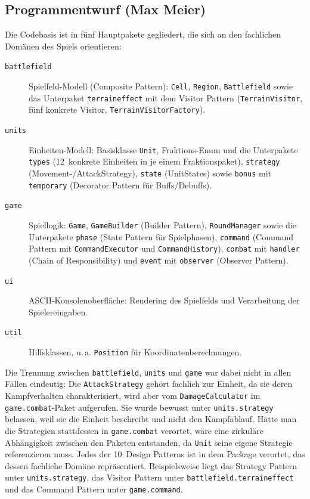 \subsection{Programmentwurf (Max Meier)}
\label{sec:programmentwurf}

Die Codebasis ist in fünf Hauptpakete gegliedert, die sich an den fachlichen Domänen des Spiels orientieren:

\begin{description}
	\item[\texttt{battlefield}]
	Spielfeld-Modell (Composite Pattern): \texttt{Cell}, \texttt{Region}, \texttt{Battlefield} sowie das Unter\-paket \texttt{terraineffect} mit dem Visitor Pattern (\texttt{TerrainVisitor}, fünf konkrete Visitor, \texttt{TerrainVisitorFactory}).

	\item[\texttt{units}]
	Einheiten-Modell: Basisklasse \texttt{Unit}, Fraktions-Enum und die Unter\-pakete \texttt{types} (12~konkrete Einheiten in je einem Fraktionspaket), \texttt{strategy} (Movement-/Attack\-Strategy), \texttt{state} (Unit\-States) sowie \texttt{bonus} mit \texttt{temporary} (Decorator Pattern für Buffs/Debuffs).

	\item[\texttt{game}]
	Spiellogik: \texttt{Game}, \texttt{GameBuilder} (Builder Pattern), \texttt{RoundManager} sowie die Unter\-pakete \texttt{phase} (State Pattern für Spielphasen), \texttt{command} (Command Pattern mit \texttt{CommandExecutor} und \texttt{CommandHistory}), \texttt{combat} mit \texttt{handler} (Chain of Responsibility) und \texttt{event} mit \texttt{observer} (Observer Pattern).

	\item[\texttt{ui}]
	ASCII-Konsolenoberfläche: Rendering des Spielfelds und Verarbeitung der Spielereingaben.

	\item[\texttt{util}]
	Hilfsklassen, u.\,a. \texttt{Position} für Koordinatenberechnungen.
\end{description}

Die Trennung zwischen \texttt{battlefield}, \texttt{units} und \texttt{game} war dabei nicht in allen Fällen eindeutig:
Die \texttt{AttackStrategy} gehört fachlich zur Einheit, da sie deren Kampfverhalten charakterisiert, wird aber vom \texttt{DamageCalculator}
im \texttt{game.combat}-Paket aufgerufen. Sie wurde bewusst unter \texttt{units.strategy} belassen, weil sie die Einheit beschreibt
und nicht den Kampfablauf. Hätte man die Strategien stattdessen in \texttt{game.combat} verortet, wäre eine zirkuläre Abhängigkeit
zwischen den Paketen entstanden, da \texttt{Unit} seine eigene Strategie referenzieren muss.
Jedes der 10~Design Patterns ist in dem Package verortet, das dessen fachliche Domäne repräsentiert. Beispielsweise liegt das
Strategy Pattern unter \texttt{units.strategy}, das Visitor Pattern unter \texttt{battlefield.terraineffect} und das
Command Pattern unter \texttt{game.command}.

